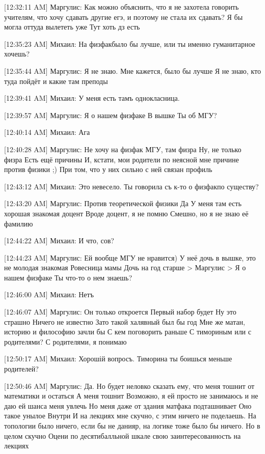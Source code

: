 \documentclass{article}
\newcommand{\yat}{{\fontencoding{X2}\selectfont\cyryat}} %
\begin{document}
{[12:32:11 AM] Маргулис:
Как можно объяснить, что я не захотела говорить учителям, что хочу сдавать другие егэ, и поэтому не стала их сдавать?
 Я бы могла оттуда вылететь уже
 Тут хоть дз есть

[12:35:23 AM] Михаил:
На физфак\yat было бы лучше, или ты именно гуманитарное хочешь?

[12:35:44 AM] Маргулис:
Я не знаю. Мне кажется, было бы лучше
 Я не знаю, кто туда пойдёт и какие там преподы

[12:39:41 AM] Михаил:
У меня есть тамъ однокласница.

[12:39:57 AM] Маргулис:
Я о нашем физфаке
 В вышке
 Ты об МГУ?

[12:40:14 AM] Михаил:
Ага

[12:40:28 AM] Маргулис:
Не хочу на физфак МГУ, там физра
 Ну, не только физра
 Есть ещё причины
 И, кстати, мои родители по неясной мне причине против физики ;)
 При том, что у них сильно с ней связан профиль

[12:43:12 AM] Михаил:
Это невесело. Ты говорила съ к-то о физфак\yat по существу?

[12:43:20 AM] Маргулис:
Против теоретической физики
 Да
 У меня там есть хорошая знакомая доцент
 Вроде доцент, я не помню
 Смешно, но я не знаю её фамилию

[12:44:22 AM] Михаил:
И что, сов?

[12:44:23 AM] Маргулис:
Ей вообще МГУ не нравится)
 У неё дочь в вышке, это не молодая знакомая
 Ровесница мамы
 Дочь на год старше
> Маргулис
> Я о нашем физфаке
Ты что-то о нем знаешь?

[12:46:00 AM] Михаил:
Нетъ

[12:46:07 AM] Маргулис:
Он только откроется
 Первый набор будет
 Ну это страшно
 Ничего не известно
 Зато такой халявный был бы год
 Мне же матан, историю и философию зачли бы
 С кем поговорить раньше
 С тимориным или с родителями?
 С родителями, я понимаю

[12:50:17 AM] Михаил:
Хорошій вопросъ.
 Тиморина ты боишься меньше родителей?

[12:50:46 AM] Маргулис:
Да.
 Но будет неловко сказать ему, что меня тошнит от математики и остаться
 А меня тошнит
 Возможно, я ей просто не занимаюсь и не даю ей шанса меня увлечь
 Но меня даже от здания матфака подташнивает
 Оно такое унылое
 Внутри
 И на лекциях мне скучно, с этим ничего не поделаешь. На топологии было ничего, если бы не данияр, на логике тоже было бы ничего.
 Но в целом скучно
 Оцени по десятибалльной шкале свою заинтересованность на лекциях

}
\end{document}
